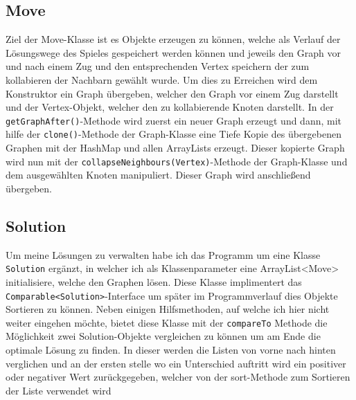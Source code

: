 \documentclass[12pt,a4paper]{article}
\begin{document}
\subsection{Move}
Ziel der Move-Klasse ist es Objekte erzeugen zu können, welche als \glqq Verlauf\grqq{} der Lösungswege des Spieles gespeichert werden können und jeweils den Graph vor und nach einem \glqq Zug\grqq{} und den entsprechenden Vertex speichern der zum kollabieren der Nachbarn gewählt wurde. Um dies zu Erreichen wird dem Konstruktor ein Graph übergeben, welcher den Graph vor einem Zug darstellt und der Vertex-Objekt, welcher den zu kollabierende Knoten darstellt. In der \texttt{getGraphAfter()}-Methode wird zuerst ein neuer Graph erzeugt und dann, mit hilfe der \texttt{clone()}-Methode der Graph-Klasse eine Tiefe Kopie des übergebenen Graphen mit der HashMap und allen ArrayLists erzeugt. Dieser kopierte Graph wird nun mit der \texttt{collapseNeighbours(Vertex)}-Methode der Graph-Klasse und dem ausgewählten Knoten manipuliert. Dieser Graph wird anschließend übergeben.

\subsection{Solution}
Um meine Lösungen zu verwalten habe ich das Programm um eine Klasse \texttt{Solution} ergänzt, in welcher ich als Klassenparameter eine ArrayList<Move> initialisiere, welche den Graphen lösen. Diese Klasse implimentert das \texttt{Comparable<Solution>}-Interface um später im Programmverlauf dies Objekte Sortieren zu können. Neben einigen Hilfsmethoden, auf welche ich hier nicht weiter eingehen möchte, bietet diese Klasse mit der \texttt{compareTo} Methode die Möglichkeit zwei Solution-Objekte vergleichen zu können um am Ende die optimale Lösung zu finden. In dieser werden die Listen von vorne nach hinten verglichen und an der ersten stelle wo ein Unterschied auftritt wird ein positiver oder negativer Wert zurückgegeben, welcher von der sort-Methode zum Sortieren der Liste verwendet wird
\end{document}
